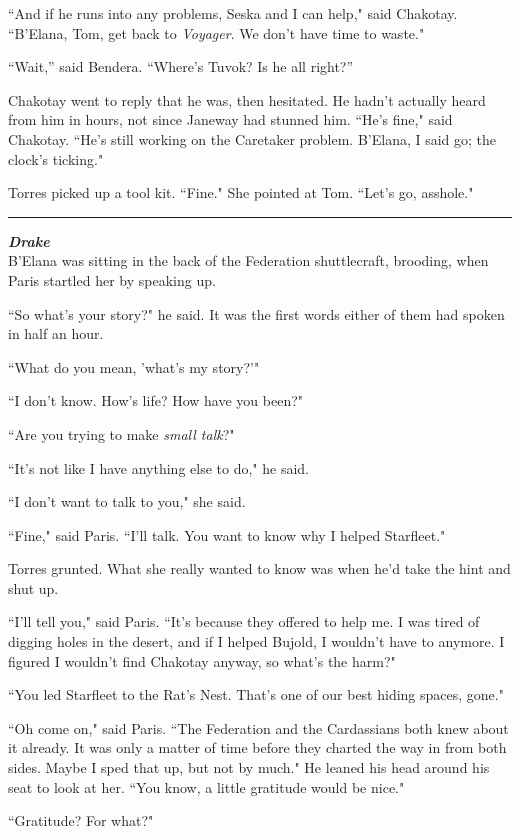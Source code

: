 \documentclass[twoside,letterpaper,12pt]{memoir}
\begin{document}
``And if he runs into any problems, Seska and I can help," said Chakotay. ``B'Elana, Tom, get back to \textit{Voyager}. We don't have time to waste."

``Wait,” said Bendera. ``Where’s Tuvok? Is he all right?”

Chakotay went to reply that he was, then hesitated. He hadn’t actually heard from him in hours, not since Janeway had stunned him. ``He's fine," said Chakotay. ``He's still working on the Caretaker problem. B'Elana, I said go; the clock's ticking."

Torres picked up a tool kit. ``Fine." She pointed at Tom. ``Let's go, asshole."

\fancybreak{\rule{3cm}{0.4 pt}}
\noindent\textit{\textbf{Drake}}\\

B'Elana was sitting in the back of the Federation shuttlecraft, brooding, when Paris startled her by speaking up.

``So what's your story?" he said. It was the first words either of them had spoken in half an hour.

``What do you mean, 'what's my story?'"

``I don't know. How's life? How have you been?"

``Are you trying to make \textit{small talk}?"

``It's not like I have anything else to do," he said.

``I don't want to talk to you," she said.

``Fine," said Paris. ``I'll talk. You want to know why I helped Starfleet."

Torres grunted. What she really wanted to know was when he'd take the hint and shut up.

``I'll tell you," said Paris. ``It's because they offered to help me. I was tired of digging holes in the desert, and if I helped Bujold, I wouldn't have to anymore. I figured I wouldn't find Chakotay anyway, so what's the harm?"

``You led Starfleet to the Rat's Nest. That's one of our best hiding spaces, gone."

``Oh come on," said Paris. ``The Federation and the Cardassians both knew about it already. It was only a matter of time before they charted the way in from both sides. Maybe I sped that up, but not by much." He leaned his head around his seat to look at her. ``You know, a little gratitude would be nice."

``Gratitude? For what?"
\end{document}
